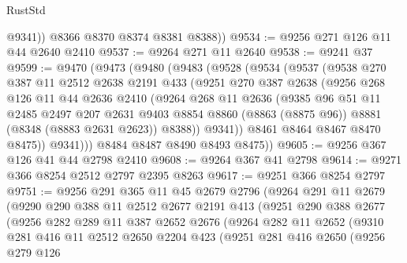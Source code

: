 \begin{lexlean}{RustStd}
\begin{coremodule}
            @9341))
        @8366
        @8370
        @8374
        @8381
        @8388))
@9534 := @9256 @271 @126 @11 @44 @2640 @2410
@9537 := @9264 @271 @11 @2640
@9538 := @9241 @37
@9599 := @9470
    (@9473
      (@9480
        (@9483
          (@9528
            (@9534
              (@9537
                (@9538
                  @270
                  @387
                  @11
                  @2512
                  @2638
                  @2191
                  @433
                  (@9251
                    @270
                    @387
                    @2638
                    (@9256
                      @268
                      @126
                      @11
                      @44
                      @2636
                      @2410
                      (@9264
                        @268
                        @11
                        @2636
                        (@9385
                          @96
                          @51
                          @11
                          @2485
                          @2497
                          @207
                          @2631
                          @9403
                          @8854
                          @8860
                          (@8863 (@8875 @96))
                          @8881
                          (@8348 (@8883 @2631 @2623))
                          @8388))
                      @9341))
                  @8461
                  @8464
                  @8467
                  @8470
                  @8475))
              @9341)))
        @8484
        @8487
        @8490
        @8493
        @8475))
@9605 := @9256 @367 @126 @41 @44 @2798 @2410
@9608 := @9264 @367 @41 @2798
@9614 := @9271 @366 @8254 @2512 @2797 @2395 @8263
@9617 := @9251 @366 @8254 @2797
@9751 := @9256
    @291
    @365
    @11
    @45
    @2679
    @2796
    (@9264
      @291
      @11
      @2679
      (@9290
        @290
        @388
        @11
        @2512
        @2677
        @2191
        @413
        (@9251
          @290
          @388
          @2677
          (@9256
            @282
            @289
            @11
            @387
            @2652
            @2676
            (@9264
              @282
              @11
              @2652
              (@9310
                @281
                @416
                @11
                @2512
                @2650
                @2204
                @423
                (@9251
                  @281
                  @416
                  @2650
                  (@9256
                    @279
                    @126

\end{coremodule}
\end{lexlean}
